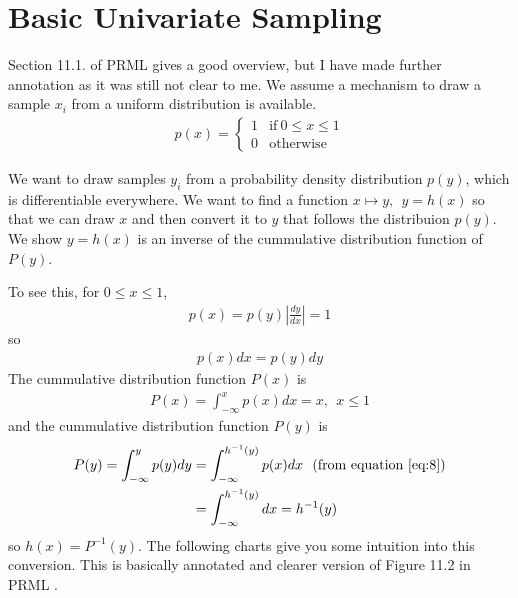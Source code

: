 \documentclass[a4]{article}
\begin{document}
\section{Basic Univariate Sampling}
Section 11.1. of PRML\cite{bishop2007} gives a good overview, but I have made further annotation as it was still not clear to me.
We assume a mechanism to draw a sample $x_i$ from a uniform distribution is available.
\begin{equation}
\begin{aligned}
p(x) = \begin{cases}
1 & \text{if}\: 0 \le x \le 1\\
0 & \text{otherwise}
\end{cases}
\end{aligned}
\end{equation}

We want to draw samples $y_i$ from a probability density distribution $p(y)$,
 which is differentiable everywhere.
We want to find a function $x \mapsto y,\:\: y = h(x)$ so that we can draw $x$ and then
convert it to $y$ that follows the distribuion $p(y)$.
We show $y = h(x)$ is an inverse of the cummulative distribution function of $P(y)$.

To see this, for $0\le x \le 1$, 
\begin{equation}
\begin{aligned}
p(x) = p(y)\left|\frac{dy}{dx}\right|=1
\end{aligned}
\end{equation}
so \begin{equation}
\begin{aligned}
p(x)dx = p(y)dy
\end{aligned}
\end{equation}
The cummulative distribution function $P(x)$ is
\begin{equation}
\begin{aligned}
P(x) = \int_{-\infty}^{x}p(x)dx = x, \:\:x \le 1\label{eq:8}
\end{aligned}
\end{equation}
and the cummulative distribution function $P(y)$ is
\begin{equation}
\begin{aligned}
P(y) = \int_{-\infty}^{y}p(y)dy &= \int_{-\infty}^{h^{-1}(y)}p(x)dx
\:\:\: \text{(from equation \ref{eq:8})}\\
&= \int^{h^{-1}(y)}_{-\infty}dx = h^{-1}(y) 
\end{aligned}
\end{equation}
so $h(x) = P^{-1}(y)$.
The following charts give you some intuition into this conversion.
This is basically annotated and clearer version of Figure 11.2 in PRML \cite{bishop2007}.
\end{document}
